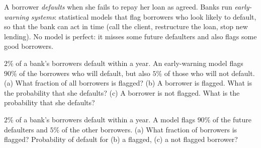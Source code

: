 
\begin{problem}
	\begin{context}
		A borrower \emph{defaults} when she fails to repay her loan as agreed.
		Banks run \emph{early-warning systems}: statistical models that flag
		borrowers who look likely to default, so that the bank can act in time
		(call the client, restructure the loan, stop new lending). No model is
		perfect: it misses some future defaulters and also flags some good
		borrowers.
	\end{context}
	$2\%$ of a bank's borrowers default within a year. An early-warning model
	flags $90\%$ of the borrowers who will default, but also $5\%$ of those who
	will not default.
	(a) What fraction of all borrowers is flagged?
	(b) A borrower is flagged. What is the probability that she defaults?
	(c) A borrower is not flagged. What is the probability that she defaults?
\end{problem}

\begin{slideproblem}
	$2\%$ of a bank's borrowers default within a year. A model flags $90\%$ of
	the future defaulters and $5\%$ of the other borrowers. (a) What fraction
	of borrowers is flagged? Probability of default for (b) a flagged, (c) a
	not flagged borrower?
\end{slideproblem}

